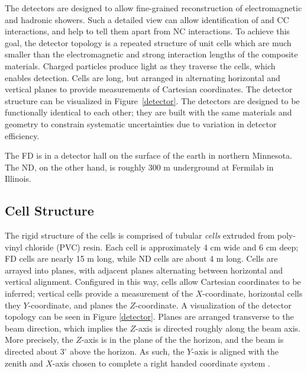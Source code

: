  The \nova detectors are designed to allow fine-grained reconstruction of electromagnetic and hadronic showers.
 Such a detailed view can allow identification of \numu and \nue CC
 interactions, and help to tell them apart from NC interactions.  To achieve this goal, the detector topology is a repeated structure of unit cells which are much smaller than the electromagnetic and strong interaction lengths of the composite materials.  Charged particles produce light as they traverse the cells, which enables detection.  Cells are long, but arranged in alternating horizontal and vertical planes to provide measurements of Cartesian coordinates.
The detector structure can be visualized in Figure~\ref{detector}.
The detectors are designed to be functionally identical to each other; they are built with the same materials and geometry to constrain systematic uncertainties due to variation in detector efficiency.

The \nova FD is in a detector hall on the surface of the earth
in northern Minnesota.
The ND, on the other hand, is roughly 300 m underground at Fermilab in Illinois.


\subsection{Cell Structure}
\label{cell_section}
 The rigid structure of the cells is comprised of tubular \textit{cells} extruded from poly-vinyl chloride (PVC) resin.  Each cell is approximately 4 cm wide and 6 cm deep; FD cells are nearly 15 m long, while ND cells are about 4 m long.
 Cells are arrayed into planes, with adjacent planes alternating between horizontal and vertical alignment.
 Configured in this way, cells allow Cartesian coordinates to be inferred; vertical cells provide a measurement of the $X$-coordinate, horizontal cells they $Y$-coordinate, and planes the $Z$-coordinate.  A visualization of the detector topology can be seen in Figure \ref{detector}.
 Planes are arranged transverse to the beam direction, which implies the
 $Z$-axis is directed roughly along the beam axis.
 More precisely, the $Z$-axis is in the plane of the the horizon,
 and the beam is directed about $3^\circ$ above the horizon.
 As such, the $Y$-axis is aligned with the zenith and $X$-axis chosen to
 complete a right handed coordinate system \cite{tdr}.

